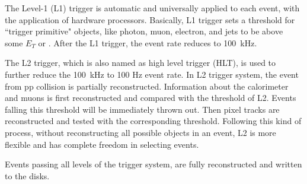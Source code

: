 The Level-1 (L1) trigger is automatic and universally applied to each event, with the application of hardware processors. Basically, L1 trigger sets a threshold for ``trigger primitive" objects, like photon, muon, electron, and jets to be above some $E_{T}$ or \pt.  After the L1 trigger, the event rate reduces to 100~kHz. 

The L2 trigger, which is also named as high level trigger (HLT), is used to further reduce the 100~kHz to 
100 Hz event rate. 
In L2 trigger system, the event from pp collision is partially reconstructed. 
Information about the calorimeter and muons is first reconstructed and compared with the threshold of L2. Events falling this threshold will be immediately thrown out. Then pixel tracks are reconstructed and tested with the corresponding threshold. Following this kind of process, without reconstructing all possible objects in an event, L2 is more flexible and has complete freedom in selecting events. 

Events passing all levels of the trigger system, are fully reconstructed and written to the disks. 
  









  



  



 
 
 






